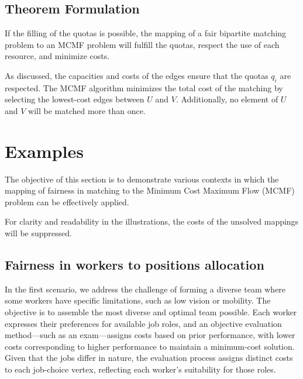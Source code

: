         \subsection{Theorem Formulation}
        
        \begin{theorem}
        If the filling of the quotas is possible, the mapping of a fair bipartite matching problem to an MCMF problem will fulfill the quotas, respect the use of each resource, and minimize costs.
        \end{theorem}
        
        As discussed, the capacities and costs of the edges ensure that the quotas $q_i$ are respected. The MCMF algorithm minimizes the total cost of the matching by selecting the lowest-cost edges between $U$ and $V$. Additionally, no element of $U$ and $V$ will be matched more than once.
        
        \section{Examples}
        The objective of this section is to demonstrate various contexts in which the mapping of fairness in matching to the Minimum Cost Maximum Flow (MCMF) problem can be effectively applied.
        
        For clarity and readability in the illustrations, the costs of the unsolved mappings will be suppressed.
        
        \subsection{Fairness in workers to positions allocation}
        \label{sec:workers_jobs_example}

        In the first scenario, we address the challenge of forming a diverse team where some workers have specific limitations, such as low vision or mobility. The objective is to assemble the most diverse and optimal team possible. Each worker expresses their preferences for available job roles, and an objective evaluation method—such as an exam—assigns costs based on prior performance, with lower costs corresponding to higher performance to maintain a minimum-cost solution. Given that the jobs differ in nature, the evaluation process assigns distinct costs to each job-choice vertex, reflecting each worker's suitability for those roles.
        
